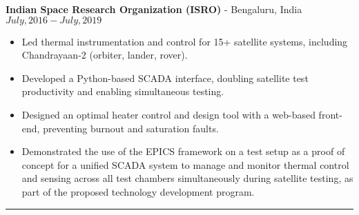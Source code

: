 \textbf{Indian Space Research Organization (ISRO)} - Bengaluru, India \hfill $July, 2016 - July, 2019$

\begin{itemize}
        \item Led thermal instrumentation and control for 15+ satellite systems, including Chandrayaan-2 (orbiter, lander, rover).
        \item Developed a Python-based SCADA interface, doubling satellite test productivity and enabling simultaneous testing.
	\item Designed an optimal heater control and design tool with a web-based front-end, preventing burnout and saturation faults.
        \item Demonstrated the use of the EPICS framework on a test setup as a proof of concept for a unified SCADA
                system to manage and monitor thermal control and sensing across all test chambers simultaneously during
                satellite testing, as part of the proposed technology development program.
\end{itemize}
\noindent\rule{\textwidth}{0.4pt}
